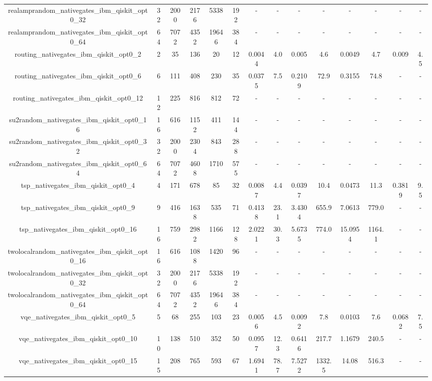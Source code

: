 \begin{table}[htb]
{\begin{tabular}{|c|c|c|c|c|c|c|c|c|c|c|c|c|c|}
realamprandom\_nativegates\_ibm\_qiskit\_opt0\_32 & 32 & 2000 & 2176 & 5338 & 192 & - & - & - & - & - & - & - & - \\ 
realamprandom\_nativegates\_ibm\_qiskit\_opt0\_64 & 64 & 7072 & 4352 & 19646 & 384 & - & - & - & - & - & - & - & - \\ 
routing\_nativegates\_ibm\_qiskit\_opt0\_2 & 2 & 35 & 136 & 20 & 12 & 0.0044 & 4.0 & 0.005 & 4.6 & 0.0049 & 4.7 & 0.009 & 4.5 \\ 
routing\_nativegates\_ibm\_qiskit\_opt0\_6 & 6 & 111 & 408 & 230 & 35 & 0.0375 & 7.5 & 0.2109 & 72.9 & 0.3155 & 74.8 & - & - \\ 
routing\_nativegates\_ibm\_qiskit\_opt0\_12 & 12 & 225 & 816 & 812 & 72 & - & - & - & - & - & - & - & - \\ 
su2random\_nativegates\_ibm\_qiskit\_opt0\_16 & 16 & 616 & 1152 & 411 & 144 & - & - & - & - & - & - & - & - \\ 
su2random\_nativegates\_ibm\_qiskit\_opt0\_32 & 32 & 2000 & 2304 & 843 & 288 & - & - & - & - & - & - & - & - \\ 
su2random\_nativegates\_ibm\_qiskit\_opt0\_64 & 64 & 7072 & 4608 & 1710 & 575 & - & - & - & - & - & - & - & - \\ 
tsp\_nativegates\_ibm\_qiskit\_opt0\_4 & 4 & 171 & 678 & 85 & 32 & 0.0087 & 4.4 & 0.0397 & 10.4 & 0.0473 & 11.3 & 0.3819 & 9.5 \\ 
tsp\_nativegates\_ibm\_qiskit\_opt0\_9 & 9 & 416 & 1638 & 535 & 71 & 0.4138 & 23.1 & 3.4304 & 655.9 & 7.0613 & 779.0 & - & - \\ 
tsp\_nativegates\_ibm\_qiskit\_opt0\_16 & 16 & 759 & 2982 & 1166 & 128 & 2.0221 & 30.3 & 5.6735 & 774.0 & 15.0954 & 1164.1 & - & - \\ 
twolocalrandom\_nativegates\_ibm\_qiskit\_opt0\_16 & 16 & 616 & 1088 & 1420 & 96 & - & - & - & - & - & - & - & - \\ 
twolocalrandom\_nativegates\_ibm\_qiskit\_opt0\_32 & 32 & 2000 & 2176 & 5338 & 192 & - & - & - & - & - & - & - & - \\ 
twolocalrandom\_nativegates\_ibm\_qiskit\_opt0\_64 & 64 & 7072 & 4352 & 19646 & 384 & - & - & - & - & - & - & - & - \\ 
vqe\_nativegates\_ibm\_qiskit\_opt0\_5 & 5 & 68 & 255 & 103 & 23 & 0.0056 & 4.5 & 0.0092 & 7.8 & 0.0103 & 7.6 & 0.0682 & 7.5 \\ 
vqe\_nativegates\_ibm\_qiskit\_opt0\_10 & 10 & 138 & 510 & 352 & 50 & 0.0957 & 12.3 & 0.6416 & 217.7 & 1.1679 & 240.5 & - & - \\ 
vqe\_nativegates\_ibm\_qiskit\_opt0\_15 & 15 & 208 & 765 & 593 & 67 & 1.6941 & 78.7 & 7.5272 & 1332.5 & 14.08 & 516.3 & - & - \\ 

\end{tabular}}
\end{table}
